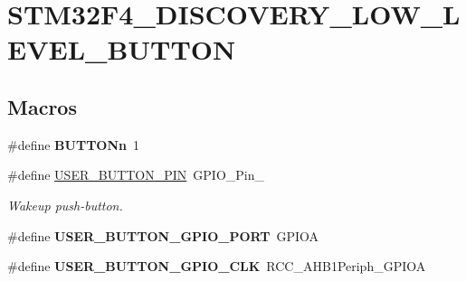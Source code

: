 \hypertarget{group___s_t_m32_f4___d_i_s_c_o_v_e_r_y___l_o_w___l_e_v_e_l___b_u_t_t_o_n}{\section{S\-T\-M32\-F4\-\_\-\-D\-I\-S\-C\-O\-V\-E\-R\-Y\-\_\-\-L\-O\-W\-\_\-\-L\-E\-V\-E\-L\-\_\-\-B\-U\-T\-T\-O\-N}
\label{group___s_t_m32_f4___d_i_s_c_o_v_e_r_y___l_o_w___l_e_v_e_l___b_u_t_t_o_n}
}
\subsection*{Macros}
\begin{DoxyCompactItemize}
\item 
\hypertarget{group___s_t_m32_f4___d_i_s_c_o_v_e_r_y___l_o_w___l_e_v_e_l___b_u_t_t_o_n_ga43d47e509ada64329393005c3be15d64}{\#define {\bfseries B\-U\-T\-T\-O\-Nn}~1}\label{group___s_t_m32_f4___d_i_s_c_o_v_e_r_y___l_o_w___l_e_v_e_l___b_u_t_t_o_n_ga43d47e509ada64329393005c3be15d64}

\item 
\hypertarget{group___s_t_m32_f4___d_i_s_c_o_v_e_r_y___l_o_w___l_e_v_e_l___b_u_t_t_o_n_ga34df6915e3013d6a0c74131d3946b659}{\#define \hyperlink{group___s_t_m32_f4___d_i_s_c_o_v_e_r_y___l_o_w___l_e_v_e_l___b_u_t_t_o_n_ga34df6915e3013d6a0c74131d3946b659}{U\-S\-E\-R\-\_\-\-B\-U\-T\-T\-O\-N\-\_\-\-P\-I\-N}~G\-P\-I\-O\-\_\-\-Pin\-\_}\label{group___s_t_m32_f4___d_i_s_c_o_v_e_r_y___l_o_w___l_e_v_e_l___b_u_t_t_o_n_ga34df6915e3013d6a0c74131d3946b659}

\begin{DoxyCompactList}\small\item\em Wakeup push-\/button. \end{DoxyCompactList}\item 
\hypertarget{group___s_t_m32_f4___d_i_s_c_o_v_e_r_y___l_o_w___l_e_v_e_l___b_u_t_t_o_n_gae2e6fc2fdfda22b4eed3667375a8bd81}{\#define {\bfseries U\-S\-E\-R\-\_\-\-B\-U\-T\-T\-O\-N\-\_\-\-G\-P\-I\-O\-\_\-\-P\-O\-R\-T}~G\-P\-I\-O\-A}\label{group___s_t_m32_f4___d_i_s_c_o_v_e_r_y___l_o_w___l_e_v_e_l___b_u_t_t_o_n_gae2e6fc2fdfda22b4eed3667375a8bd81}

\item 
\hypertarget{group___s_t_m32_f4___d_i_s_c_o_v_e_r_y___l_o_w___l_e_v_e_l___b_u_t_t_o_n_gac94af9563fb54d762f1d5351593ee218}{\#define {\bfseries U\-S\-E\-R\-\_\-\-B\-U\-T\-T\-O\-N\-\_\-\-G\-P\-I\-O\-\_\-\-C\-L\-K}~R\-C\-C\-\_\-\-A\-H\-B1\-Periph\-\_\-\-G\-P\-I\-O\-A}\label{group___s_t_m32_f4___d_i_s_c_o_v_e_r_y___l_o_w___l_e_v_e_l___b_u_t_t_o_n_gac94af9563fb54d762f1d5351593ee218}


\end{DoxyCompactItemize}
